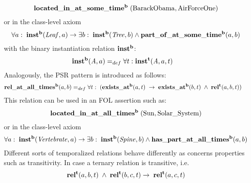 \begin{equation}
\begin{split}
\mathrm{\mathbf{located\_in\_at\_some\_time^b}} \;(\mathrm{BarackObama}, \mathrm{AirForceOne})  
\end{split}
\label{eq:personlocated}
\end{equation}
%
or in the class-level axiom
%
\begin{equation}
\begin{split}
\forall a:\; \mathrm{\mathbf{inst^b}}(\mathit{Leaf}, a) 
\rightarrow
\exists b:\;\mathrm{\mathbf{inst^b}}(\mathit{Tree}, b)
\wedge
\mathrm{\mathbf{part\_of\_at\_some\_time^b}}(a,b)  \end{split}
\label{eq:leaf2}
\end{equation}
%
with the binary instantiation relation $\mathrm{\mathbf{inst^b}}$:
%  
\begin{equation}
\begin{split}
\mathrm{\mathbf{inst^b}} (\mathit{A},a) =_{def}&\; \forall t: \mathrm{\mathbf{inst^t}}(\mathit{A},a,t)  
\end{split}
\label{eq:temporarily:inst}
\end{equation}
%
Analogously, the PSR pattern is introduced as follows:  
%
\begin{equation}
\begin{split}
\mathrm{\mathbf{rel\_at\_all\_times^b}} (a,b) =_{def}&\;
\forall t: \; (\mathrm{\mathbf{exists\_at^b}} (a, t) \; \rightarrow \; \mathrm{\mathbf{exists\_at^b}} (b, t) \; \wedge \; \mathrm{\mathbf{rel^t}}(a,b,t))  
\end{split}
\label{eq:permanently:ind}
\end{equation}
%
This relation can be used in an FOL assertion such as:
%
\begin{equation}
\begin{split}
\mathrm{\mathbf{located\_in\_at\_all\_times^b}} \;(\mathrm{Sun}, \mathrm{Solar\_System})  
\end{split}
\label{eq:earth}
\end{equation}
%
or in the class-level axiom
%
\begin{equation}
\begin{split}
\forall a:\; \mathrm{\mathbf{inst^b}}(\mathit{Vertebrate}, a) 
\rightarrow
\exists b:\;\mathrm{\mathbf{inst^b}}(\mathit{Spine}, b)
\wedge
\mathrm{\mathbf{has\_part\_at\_all\_times^b}}(a,b)  \end{split}
\label{eq:spine}
\end{equation}
%  
Different sorts of temporalized relations behave differently as concerns properties such as transitivity.
In case a ternary relation is transitive, i.e.  
%
\begin{equation}
\begin{split}
\mathrm{\mathbf{rel^t}}(a,b,t) \; \wedge \; \mathrm{\mathbf{rel^t}}(b,c,t) \rightarrow \; \mathrm{\mathbf{rel^t}}(a,c,t)   
\end{split}
\label{eq:trtrans}
\end{equation}    

